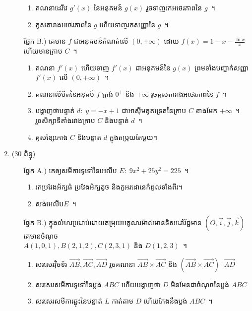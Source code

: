 \documentclass[11pt,a4paper]{article}
\def\hard{\leavevmode\makebox[0pt][r]{\large\ensuremath{\star}\hspace{2em}}}
\begin{document}
\begin{enumerate}[I]
\begin{itemize}
\begin{enumerate}[a]
\item គណនាដេរីវេ $ g'(x) $ នៃអនុគមន៍ $ g(x) $ រួចទាញរកអថេរភាពនៃ $ g $~។
\item គូសតារាងអថេរភាពនៃ $ g $ ហើយទាញរកសញ្ញានៃ $ g $~។
\end{enumerate}
\item[ផ្នែក B.)] គេមាន $ f $ ជាអនុគមន៍កំណត់លើ $ (0,+\infty) $ ដោយ $ f(x)=1-x-\frac{\ln x}{x} $ ហើយមានក្រាប $ C $~។
\begin{enumerate}[a]
\item គណនា $ f'(x) $ ហើយទាញ $ f'(x) $ ជាអនុគមន៍នៃ $ g(x) $ ព្រមទាំងបញ្ជាក់សញ្ញា $ f'(x) $ លើ $ (0,+\infty) $~។
\item គណនាលីមីត​នៃអនុគម៍ $ f $ ត្រង់ $ 0^+ $ និង $ +\infty $ រួចគូសតារាងអថេរភាពនៃ $ f $~។
\item បង្ហាញថាបន្ទាត់ $ d:\;y=-x+1 $ ជាអាស៊ីមតូតទ្រេតនៃក្រាប $ C $ ខាងមែក $ +\infty $~។\\
រួចសិក្សាទីតាំងរវាងក្រាប $ C $ និងបន្ទាត់ $ d $~។
\item គូសខ្សែកោង $ C $ និងបន្ទាត់ $ d $ ក្នុងតម្រុយតែមួយ។
\end{enumerate}
\end{itemize}
\item\hard ($ 30 $ ពិន្ទុ) 
\begin{itemize}
\item[ផ្នែក A.)] គេឲ្យសមីការទូទៅនៃអេលីប $ E:\;9x^2+25y^2=225 $~។
\begin{enumerate}[a]
\item រកប្រវែងអ័ក្សធំ ប្រវែងអ័ក្សតូច និងកូអរដោនេកំពូលទាំងពីរ។
\item សង់អេលីប​ $ E $~។
\end{enumerate}
\item[ផ្នែក B.)] ក្នុងលំហរប្រដាប់ដោយតម្រុយអតូណរម៉ាល់មានទិសដៅវិជ្ជមាន $ (O,\vec{i},\vec{j},\vec{k}) $ គេមានចំណុច​\\
$ A(1,0,1),B(2,1,2),C(2,3,1) $ និង $ D(1,2,3) $~។
\begin{enumerate}[a]
\item សរសេរវ៉ិចទ័រ $ \overrightarrow{AB},\overrightarrow{AC},\overrightarrow{AD} $ រួចគណនា $ \overrightarrow{AB}\times\overrightarrow{AC} $ និង $ (\overrightarrow{AB}\times\overrightarrow{AC})\cdot\overrightarrow{AD} $
\item សរសេរសមីការទូទៅនៃប្លង់ $ ABC $ ហើយបង្ហាញថា $ D $ មិនមែនជាចំណុចនៃប្លង់ $ ABC $
\item សរសេរសមីការឆ្លុះនៃបន្ទាត់ $ L $ កាត់តាម $ D $ ហើយកែងនឹងប្លង់ $ ABC $~។
\end{enumerate}
\end{itemize}
\end{enumerate}
\end{document}
